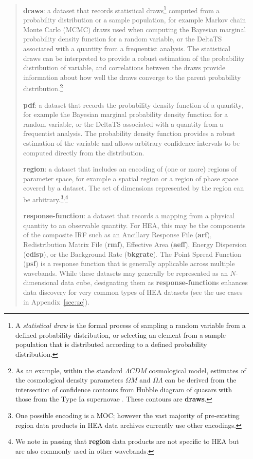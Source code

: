 \documentclass[11pt,a4paper]{ivoa}
\begin{document}
\begin{quote}
{\bf draws}: a dataset that records statistical draws\footnote{A {\em statistical draw\/} is the formal process of sampling a random variable from a defined probability distribution, or selecting an element from a sample population that is distributed according to a defined probability distribution.} computed from a probability distribution or a sample population, for example Markov chain Monte Carlo (MCMC) draws used when computing the Bayesian marginal probability density function for a random variable, or the DeltaTS associated with a quantity from a frequentist analysis. The statistical draws can be interpreted to provide a robust estimation of the probability distribution of variable, and correlations between the draws provide information about how well the draws converge to the parent probability distribution.\footnote{As an example, within the standard $\Lambda CDM$ cosmological model, estimates of the cosmological density parameters $\Omega M$ and $\Omega\Lambda$ can be derived from the intersection of confidence contours from Hubble diagram of quasars with those from the Type Ia supernovae \citep{2019adds.book..283C}.  These contours are {\bf draws}.}

{\bf pdf}: a dataset that records the probability density function of a quantity, for example the Bayesian marginal probability density function for a random variable, or the DeltaTS associated with a quantity from a frequentist analysis. The probability density function provides a robust estimation of the variable and allows arbitrary confidence intervals to be computed directly from the distribution.

{\bf region}: a dataset that includes an encoding of (one or more) regions of parameter space, for example a spatial region or a region of phase space covered by a dataset. The set of dimensions represented by the region can be arbitrary.\footnote{One possible encoding is a \gls{MOC}; however the vast majority of pre-existing region data products in \gls{HEA} data archives currently use other encodings.}$^{, }$\footnote{We note in passing that {\bf region} data products are not specific to \gls{HEA} but are also commonly used in other wavebands.}

{\bf response-function}: a dataset that records a mapping from a physical quantity to an observable quantity. For \gls{HEA}, this may be the components of the composite \gls{IRF} such as an Ancillary Response File ({\bf arf}), Redistribution Matrix File ({\bf rmf}), Effective Area ({\bf aeff}), Energy Dispersion ({\bf edisp}), or the Background Rate ({\bf bkgrate}). The Point Spread Function ({\bf psf}) is a response function that is generally applicable across multiple wavebands. While these datasets may generally be represented as an $N$-dimensional data cube, designating them as {\bf response-function}s enhances data discovery for very common types of \gls{HEA} datasets (see the use cases in Appendix~\ref{sec:uc}).
\end{quote}
\end{document}
